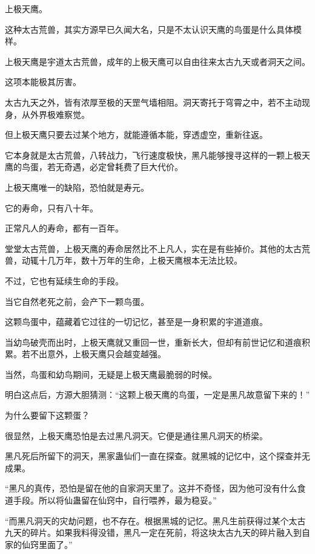 
\begin{this_body}



上极天鹰。

这种太古荒兽，其实方源早已久闻大名，只是不太认识天鹰的鸟蛋是什么具体模样。

上极天鹰是宇道太古荒兽，成年的上极天鹰可以自由往来太古九天或者洞天之间。

这项本能极其厉害。

太古九天之外，皆有浓厚至极的天罡气墙相阻。洞天寄托于穹霄之中，若不主动现身，从外界极难察觉。

但上极天鹰只要去过某个地方，就能遵循本能，穿透虚空，重新往返。

它本身就是太古荒兽，八转战力，飞行速度极快，黑凡能够搜寻这样的一颗上极天鹰的鸟蛋，若无奇遇，必定曾耗费了巨大代价。

上极天鹰唯一的缺陷，恐怕就是寿元。

它的寿命，只有八十年。

正常凡人的寿命，都有一百年。

堂堂太古荒兽，上极天鹰的寿命居然比不上凡人，实在是有些掉价。其他的太古荒兽，动辄十几万年，数十万年的生命，上极天鹰根本无法比较。

不过，它也有延续生命的手段。

当它自然老死之前，会产下一颗鸟蛋。

这颗鸟蛋中，蕴藏着它过往的一切记忆，甚至是一身积累的宇道道痕。

当幼鸟破壳而出时，上极天鹰就又重回一世，重新长大，但却有前世记忆和道痕积累。若不出意外，上极天鹰只会越变越强。

当然，鸟蛋和幼鸟期间，无疑是上极天鹰最脆弱的时候。

明白这点后，方源大胆猜测：“这颗上极天鹰的鸟蛋，一定是黑凡故意留下来的！”

为什么要留下这颗蛋？

很显然，上极天鹰恐怕是去过黑凡洞天。它便是通往黑凡洞天的桥梁。

黑凡死后所留下的洞天，黑家蛊仙们一直在探查。就黑城的记忆中，这个探查并无成果。

“黑凡的真传，恐怕是留在他的自家洞天里了。这并不奇怪，因为他可没有什么食道手段。所以将仙蛊留在仙窍中，自行喂养，最为稳妥。”

“而黑凡洞天的灾劫问题，也不存在。根据黑城的记忆。黑凡生前获得过某个太古九天的碎片。如果我料得没错，黑凡一定在死前，将这块太古九天的碎片融入到自家的仙窍里面了。”


\end{this_body}

